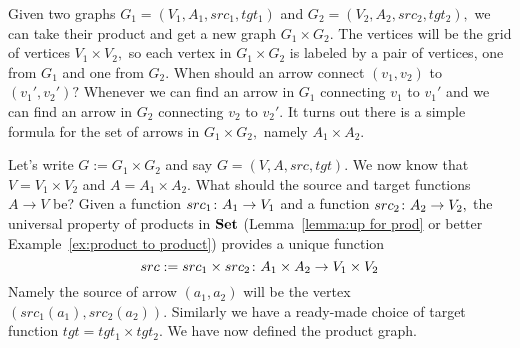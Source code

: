 \documentclass[../main/CT4S-EN-RU]{subfiles}
\begin{document}
\begin{exampleENG}\label{ex:product of graphs}
Given two graphs $G_1=(V_1,A_1,src_1,tgt_1)$ and $G_2=(V_2,A_2,src_2,tgt_2),$ we can take their product and get a new graph $G_1\times G_2.$ The vertices will be the grid of vertices $V_1\times V_2,$ so each vertex in $G_1\times G_2$ is labeled by a pair of vertices, one from $G_1$ and one from $G_2.$ When should an arrow connect $(v_1,v_2)$ to $(v_1',v_2')?$ Whenever we can find an arrow in $G_1$ connecting $v_1$ to $v_1'$ and we can find an arrow in $G_2$ connecting $v_2$ to $v_2'.$ It turns out there is a simple formula for the set of arrows in $G_1\times G_2,$ namely $A_1\times A_2.$

Let's write $G:=G_1\times G_2$ and say $G=(V,A,src,tgt).$ We now know that $V=V_1\times V_2$ and $A=A_1\times A_2.$ What should the source and target functions $A\to V$ be? Given a function $src_1\colon A_1\rightarrow V_1$ and a function $src_2\colon A_2\rightarrow V_2,$ the universal property of products in ${\mathbf{Set}}$ (Lemma~\ref{lemma:up for prod} or better Example~\ref{ex:product to product}) provides a unique function 
$$src:=src_1\times src_2\colon A_1\times A_2\rightarrow V_1\times V_2$$ 
Namely the source of arrow $(a_1,a_2)$ will be the vertex $(src_1(a_1),src_2(a_2)).$ Similarly we have a ready-made choice of target function $tgt=tgt_1\times tgt_2.$ We have now defined the product graph.


\end{exampleENG}
\end{document}
